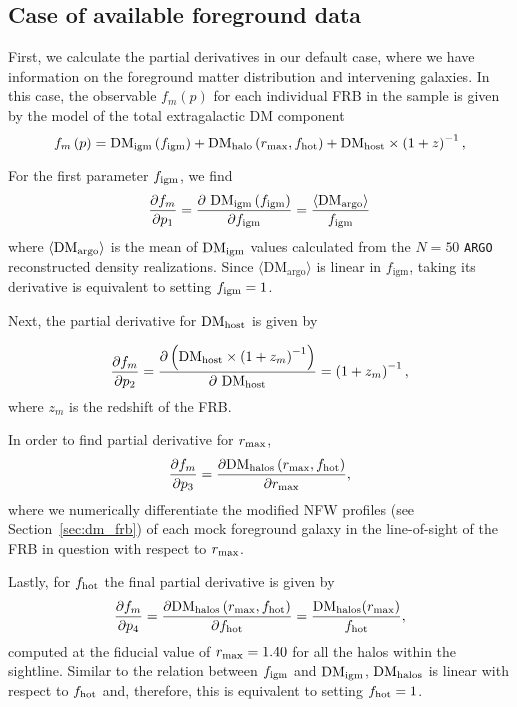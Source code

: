 \documentclass[twocolumn]{aastex63}
\newcommand{\dmargo}{\ensuremath{\mathrm{DM_{argo}}}}
\newcommand{\figm}{\ensuremath{f_\mathrm{igm}}}
\newcommand{\argo}{\texttt{ARGO}}
\begin{document}
\begin{CJK*}{UTF8}{gbsn}
\subsection{Case of available foreground data}

First, we calculate the partial derivatives in our default case, where we have information on the foreground matter distribution and intervening galaxies. In this case, the observable $f_{m}\left( p \right)$ for each individual FRB in the sample is given by the model of the total extragalactic DM component
\begin{equation}
f_m\left( p \right) = {\rm DM}_{\rm igm}\left( f_{\rm igm} \right) + {\rm DM}_{\rm halo}\left( r_{\rm max}, f_{\rm hot} \right) + {\rm DM_{host}}\times\left( 1 + z \right)^{-1}, 
\end{equation}

For the first parameter $f_{\rm igm}$, we find 
\begin{equation}
    \frac{\partial f_m }{\partial p_1} = \frac{\partial ~{\rm DM}_{\rm igm}\left( f_{\rm igm}\right)  }{\partial f_{\rm igm}} = \frac{ \langle {\rm DM_{argo}} \rangle}{\figm}
\end{equation}
where $\langle {\rm DM_{argo}} \rangle $ is the mean of ${\rm DM_{igm}}$ values calculated from the $N=50$ \argo{} reconstructed density realizations. Since $\langle \dmargo \rangle$ is linear in $\figm$, taking its derivative is equivalent to setting $f_{\rm igm} = 1$.

Next, the partial derivative for ${\rm DM_{host}}$ is given by

\begin{equation}
\label{eq:b21}
    \frac{\partial f_m }{\partial p_2} = \frac{ \partial \left( {\rm DM_{host}} \times \left( 1 + z_m \right)^{-1} \right) }{ \partial ~{\rm DM_{host}} } = \left(1 + z_m\right)^{-1},
\end{equation}
where $z_m$ is the redshift of the FRB.

In order to find partial derivative for $r_{\rm max}$, 
\begin{equation}
    \frac{\partial f_{m}}{\partial p_3} = \frac{\partial {\rm DM_{\rm halos}}\left( r_{\rm max}, f_{\rm hot} \right)}{\partial r_{\rm max}},
\end{equation}
where we numerically differentiate the modified NFW profiles (see Section~\ref{sec:dm_frb}) of each mock foreground galaxy in the line-of-sight of the FRB in question with respect to $r_{\rm max}$. 

Lastly, for $f_{\rm hot}$ the final partial derivative is given by
\begin{equation}
        \frac{\partial f_{m}}{\partial p_4} = \frac{\partial {\rm DM_{\rm halos}}\left( r_{\rm max}, f_{\rm hot} \right)}{\partial f_{\rm hot}} = \frac{ {\rm DM_{halos}}(r_{\rm max}) }{f_{\rm hot}},
\end{equation}
computed at the fiducial value of $r_{\rm max} = 1.40$ for all the halos within the sightline. Similar to the relation between $f_{\rm igm}$ and ${\rm DM_{igm}}$, ${\rm DM_{halos}}$ is linear with respect to $f_{\rm hot}$ and, therefore, this is equivalent to setting $f_{\rm hot} = 1$.


\end{CJK*}
\end{document}

